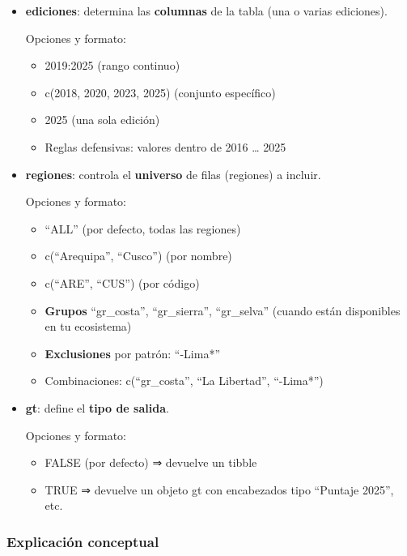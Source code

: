 \documentclass[
  11pt,
  letterpaper,
  DIV=11,
  numbers=noendperiod]{scrartcl}
\begin{document}
\begin{itemize}
\item
  \textbf{ediciones}: determina las \textbf{columnas} de la tabla (una o
  varias ediciones).

  Opciones y formato:

  \begin{itemize}
  \item
    2019:2025 (rango continuo)
  \item
    c(2018, 2020, 2023, 2025) (conjunto específico)
  \item
    2025 (una sola edición)
  \item
    Reglas defensivas: valores dentro de 2016 \ldots{} 2025
  \end{itemize}
\item
  \textbf{regiones}: controla el \textbf{universo} de filas (regiones) a
  incluir.

  Opciones y formato:

  \begin{itemize}
  \item
    ``ALL'' (por defecto, todas las regiones)
  \item
    c(``Arequipa'', ``Cusco'') (por nombre)
  \item
    c(``ARE'', ``CUS'') (por código)
  \item
    \textbf{Grupos} ``gr\_costa'', ``gr\_sierra'', ``gr\_selva'' (cuando
    están disponibles en tu ecosistema)
  \item
    \textbf{Exclusiones} por patrón: ``-Lima*''
  \item
    Combinaciones: c(``gr\_costa'', ``La Libertad'', ``-Lima*'')
  \end{itemize}
\item
  \textbf{gt}: define el \textbf{tipo de salida}.

  Opciones y formato:

  \begin{itemize}
  \item
    FALSE (por defecto) ⇒ devuelve un tibble
  \item
    TRUE ⇒ devuelve un objeto gt con encabezados tipo ``Puntaje 2025'',
    etc.
  \end{itemize}
\end{itemize}

\subsubsection{\texorpdfstring{\textbf{Explicación
conceptual}}{Explicación conceptual}}\label{explicaciuxf3n-conceptual}
\end{document}
